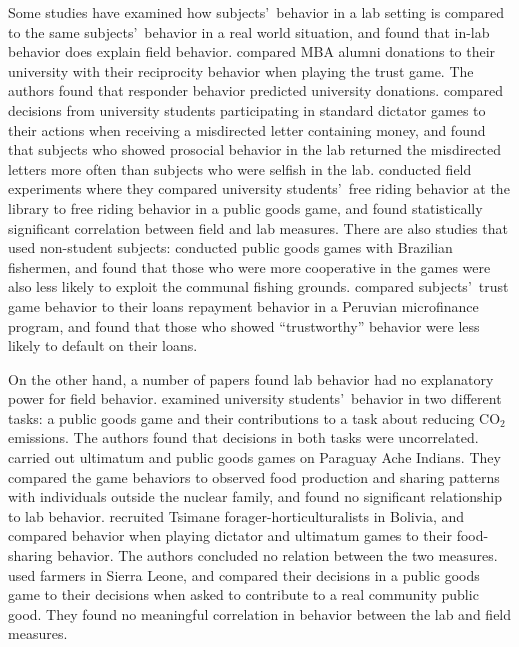 \documentclass[12pt]{article}
\begin{document}
Some studies have examined how subjects\rq \ behavior in a lab setting is compared to the same subjects\rq  \ behavior in a real world situation, and found that in-lab behavior does explain field behavior. \cite{baran_2010} compared MBA alumni donations to their university with their reciprocity behavior when playing the trust game. The authors found that responder behavior predicted university donations. \cite{franzen_pointner_2012} compared decisions from university students participating in standard dictator games to their actions when receiving a misdirected letter containing money, and found that subjects who showed prosocial behavior in the lab returned the misdirected letters more often than subjects who were selfish in the lab. \cite{englmaier_gebhardt_2011} conducted field experiments where they compared university students\rq \ free riding behavior at the library to free riding behavior in a public goods game, and found statistically significant correlation between field and lab measures. There are also studies that used non-student subjects: \cite{fehr_leibbrandt_2011} conducted public goods games with Brazilian fishermen, and found that those who were more cooperative in the games were also less likely to exploit the communal fishing grounds. \cite{karlan_2005} compared subjects\rq \ trust game behavior to their loans repayment behavior in a Peruvian microfinance program, and found that those who showed ``trustworthy'' behavior were less likely to default on their loans. 

On the other hand, a number of papers found lab behavior had no explanatory power for field behavior. \cite{goeschl_2015} examined university students\rq \ behavior in two different tasks: a public goods game and their contributions to a task about reducing CO$_{2}$ emissions. The authors found that decisions in both tasks were uncorrelated. \cite{hill_gurven_2004} carried out ultimatum and public goods games on Paraguay Ache Indians. They compared the game behaviors to observed food production and sharing patterns with individuals outside the nuclear family, and found no significant relationship to lab behavior. \cite{gurven_winking_2008} recruited Tsimane forager-horticulturalists in Bolivia, and compared behavior when playing dictator and ultimatum games to their food-sharing behavior. The authors concluded no relation between the two measures. \cite{voors_2012} used farmers in Sierra Leone, and compared their decisions in a public goods game to their decisions when asked to contribute to a real community public good. They found no meaningful correlation in behavior between the lab and field measures. 
\end{document}
